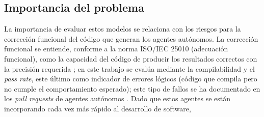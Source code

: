 \subsection{Importancia del problema}
\label{sec:importancia-problema}
La importancia de evaluar estos modelos se relaciona con los riesgos para la corrección funcional del código que generan los agentes autónomos. La corrección funcional se entiende, conforme a la norma ISO/IEC 25010 (adecuación funcional), como la capacidad del código de producir los resultados correctos con la precisión requerida \parencite{iso25010}; en este trabajo se evalúa mediante la compilabilidad y el \textit{pass rate}, este último como indicador de errores lógicos (código que compila pero no cumple el comportamiento esperado); este tipo de fallos se ha documentado en los \textit{pull requests} de agentes autónomos \parencite{ehsani2026failed}. Dado que estos agentes se están incorporando cada vez más rápido al desarrollo de software, 
